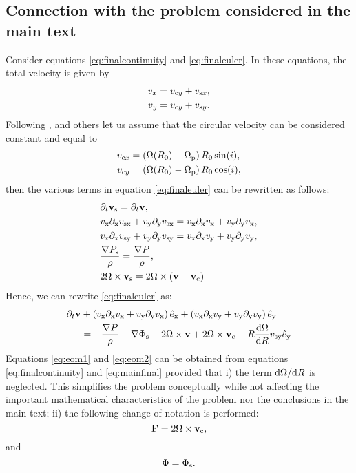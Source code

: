 \documentclass[useAMS,usenatbib]{mn2e}
\def\pa{\partial}
\begin{document}
\subsection{Connection with the problem considered in the main text}

Consider equations \eqref{eq:finalcontinuity} and \eqref{eq:finaleuler}. In these equations, the total velocity is given by
%
\begin{align} 
v_x &= v_{{\rm c}y} + v_{{\rm s}x}, \\ 
v_y &= v_{{\rm c}y} + v_{{\rm s}y}.
\end{align}
%
Following \cite{BalbusCowie1985}, \cite{DwarkadasBalbus1996} and others let us assume that the circular velocity can be considered constant and equal to
\begin{align} 
v_{{\rm c}x} &= \left(\Omega(R_0)-\Omega_{\rm p}\right)R_0 \sin(i), \\
v_{{\rm c}y} &= \left(\Omega(R_0)-\Omega_{\rm p}\right)R_0 \cos(i),
\end{align}
then the various terms in equation \eqref{eq:finaleuler} can be rewritten as follows: 
\begin{align}
& \pa_t \bfv_{\rm s}  =  \pa_t \bfv, \\ 
& v_{\rm x}\pa_{\rm x} v_{\rm sx}+v_{\rm y}\pa_{\rm y} v_{\rm sx}   =  v_{\rm x}\pa_{\rm x} v_{\rm x}+v_{\rm y}\pa_{\rm y} v_{\rm x}, \\
& v_{\rm x}\pa_{\rm x} v_{\rm sy} +v_{\rm y}\pa_{\rm y} v_{\rm sy} = v_{\rm x}\pa_{\rm x} v_{\rm y} +v_{\rm y}\pa_{\rm y} v_{\rm y}, \\
& \frac{\nabla P_{\rm s}}{\rho}  = \frac{\nabla P}{\rho}, \\ 
& 2 \bfOmega \times \bfv_{\rm s} = 2 \bfOmega \times ( \bfv - \bfv_{\rm c} )
\end{align}
Hence, we can rewrite \eqref{eq:finaleuler} as:
\begin{align}
\pa_t \bfv &+  \left(v_{\rm x}\pa_{\rm x} v_{\rm x}+v_{\rm y}\pa_{\rm y} v_{\rm x}\right)\hat{e}_{\rm x}+\left(v_{\rm x}\pa_{\rm x} v_{\rm y} +v_{\rm y}\pa_{\rm y} v_{\rm y}\right)\hat{e}_{\rm y} \\
& =- \frac{\nabla P}{\rho} -\nabla \Phi_{\rm s} - 2 \bfOmega \times \bfv +  2 \bfOmega \times \bfv_{\rm c} - R \frac{\di \Omega}{\di R} v_{\rm sy} \hat{e}_{\rm y} \label{eq:mainfinal}
\end{align}
Equations \eqref{eq:eom1} and \eqref{eq:eom2} can be obtained from equations \eqref{eq:finalcontinuity} and \eqref{eq:mainfinal} provided that i) the term $\mathrm{d} \Omega / \mathrm{d} R$ is neglected. This simplifies the problem conceptually while not affecting the important mathematical characteristics of the problem nor the conclusions in the main text; ii) the following change of notation is performed:
\begin{equation}  \label{eq:Fconnection}
\mathbf{F} = 2 {\Omega} \times \mathbf{v}_{\rm c},
\end{equation}
and
\begin{equation} \label{eq:phiconnection}
\Phi = \Phi_{\rm s}.
\end{equation}
\end{document}
